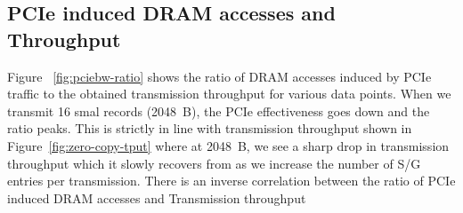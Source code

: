 \subsection{PCIe induced DRAM accesses and Throughput}

Figure ~\ref{fig:pciebw-ratio} shows the ratio of DRAM accesses induced by PCIe traffic to the obtained transmission throughput for various data points. When we transmit 16 smal records (2048~B),
the PCIe effectiveness goes down and the ratio peaks. This is strictly in line with transmission throughput shown in Figure~\ref{fig:zero-copy-tput} where at 2048~B, we see a sharp drop in transmission 
throughput which it slowly recovers from as we increase the number of S/G entries per transmission. There is an inverse correlation between the ratio of PCIe induced DRAM accesses and Transmission throughput



